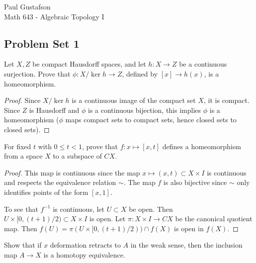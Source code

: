 \documentclass{article}
\begin{document}
\noindent Paul Gustafson\\
\noindent Math 643 - Algebraic Topology I


\subsection*{Problem Set 1}
 Let $X,Z$ be compact Hausdorff spaces, and let $h:X \to Z$ be a continuous
surjection. Prove that $\phi: X /\ker h \to Z$, defined by $[x] \to h(x)$, is a homeomorphism.
\begin{proof}
Since $X/\ker h$ is a continuous image of the compact set $X$, it is compact. Since $Z$
is Hausdorff and $\phi$ is a continuous bijection, this implies $\phi$ is a homeomorphism
($\phi$ maps compact sets to compact sets, hence closed sets to closed sets).
\end{proof}

 For fixed $t$ with $0 \le t < 1$, prove that $f: x \mapsto [x,t]$ defines a homeomorphism
from a space $X$ to a subspace of $CX$.
\begin{proof}
This map is continuous since the map $x \mapsto (x,t) \subset X \times I$ is continuous and
respects the equivalence relation $\sim$.  The map $f$ is also bijective since $\sim$ only identifies
points of the form $[x,1]$.  

To see that $f^{-1}$ is continuous, let $U \subset X$ be open. Then $U \times [0, (t+1)/2) \subset X \times I$
is open.  Let $\pi: X \times I \to CX$ be the canonical quotient map.
Then $f(U) = \pi(U \times [0, (t+1)/2)) \cap f(X)$ is open in $f(X)$.
\end{proof}



  Show that if $x$ deformation retracts to $A$ in the weak sense, then the
inclusion map $A \to X$ is a homotopy equivalence.
\end{document}
